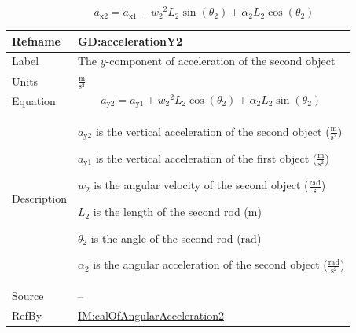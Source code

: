 \documentclass[12pt]{article}
\begin{document}
\begin{displaymath}
{a_{\text{x}2}}={a_{\text{x}1}}-{w_{2}}^{2} {L_{2}} \sin\left({θ_{2}}\right)+{α_{2}} {L_{2}} \cos\left({θ_{2}}\right)
\end{displaymath}
\vspace{\baselineskip}
\noindent
\begin{minipage}{\textwidth}
\begin{tabular}{>{\raggedright}p{}>{\raggedright\arraybackslash}p{}}
\toprule \textbf{Refname} & \textbf{GD:accelerationY2}
\label{GD:accelerationY2}
\\ \midrule
Label & The $y$-component of acceleration of the second object
        
\\ \midrule
Units & $\frac{\text{m}}{\text{s}^{2}}$
        
\\ \midrule
Equation & \begin{displaymath}
           {a_{\text{y}2}}={a_{\text{y}1}}+{w_{2}}^{2} {L_{2}} \cos\left({θ_{2}}\right)+{α_{2}} {L_{2}} \sin\left({θ_{2}}\right)
           \end{displaymath}
\\ \midrule
Description & \begin{symbDescription}
              \item{${a_{\text{y}2}}$ is the vertical acceleration of the second object ($\frac{\text{m}}{\text{s}^{2}}$)}
              \item{${a_{\text{y}1}}$ is the vertical acceleration of the first object ($\frac{\text{m}}{\text{s}^{2}}$)}
              \item{${w_{2}}$ is the angular velocity of the second object ($\frac{\text{rad}}{\text{s}}$)}
              \item{${L_{2}}$ is the length of the second rod (${\text{m}}$)}
              \item{${θ_{2}}$ is the angle of the second rod (${\text{rad}}$)}
              \item{${α_{2}}$ is the angular acceleration of the second object ($\frac{\text{rad}}{\text{s}^{2}}$)}
              \end{symbDescription}
\\ \midrule
Source & --
         
\\ \midrule
RefBy & \hyperref[IM:calOfAngularAcceleration2]{IM:calOfAngularAcceleration2}
        
\\ \bottomrule
\end{tabular}
\end{minipage}
\end{document}
